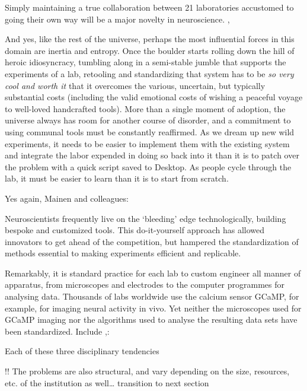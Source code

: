 \documentclass[nohyper]{tufte-book-jls}
\begin{document}
\begin{leftbar}
Simply maintaining a true collaboration between 21 laboratories
accustomed to going their own way will be a major novelty in
neuroscience. \cite{abbottInternationalLaboratorySystems2017},\end{leftbar}
And yes, like the rest of the universe, perhaps the most influential
forces in this domain are inertia and entropy. Once the boulder starts
rolling down the hill of heroic idiosyncracy, tumbling along in a
semi-stable jumble that
supports the experiments of a lab, retooling and standardizing that
system has to be \emph{so very cool and worth it} that it overcomes the
various, uncertain, but typically substantial costs (including the valid
emotional costs of wishing a peaceful voyage to well-loved handcrafted
tools). More than a single moment of adoption, the universe always has
room for another course of disorder, and a commitment to using communal
tools must be constantly reaffirmed. As we dream up new wild
experiments, it needs to be easier to implement them with the existing
system and integrate the labor expended in doing so back into it than it
is to patch over the problem with a quick script saved to Desktop. As
people cycle through the lab, it must be easier to learn than it is to
start from scratch.

Yes again, Mainen and colleagues:

\begin{leftbar}
Neuroscientists frequently live on the `bleeding' edge technologically,
building bespoke and customized tools. This do-it-yourself approach has
allowed innovators to get ahead of the competition, but hampered the
standardization of methods essential to making experiments efficient and
replicable.

Remarkably, it is standard practice for each lab to custom engineer all
manner of apparatus, from microscopes and electrodes to the computer
programmes for analysing data. Thousands of labs worldwide use the
calcium sensor GCaMP, for example, for imaging neural activity in vivo.
Yet neither the microscopes used for GCaMP imaging nor the algorithms
used to analyse the resulting data sets have been standardized. Include
\cite{mainenBetterWayCrack2016},:\end{leftbar}

Each of these three disciplinary tendencies

!! The problems are also structural, and vary depending on the size,
resources, etc. of the institution as well\ldots{} transition to next
section
\end{document}
